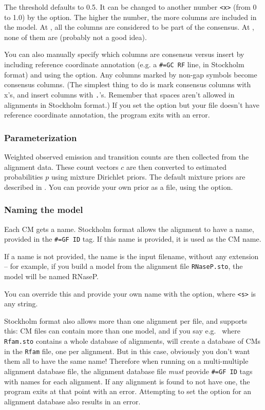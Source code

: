 The threshold defaults to 0.5. It can be changed to another number
\verb+<x>+ (from 0 to 1.0) by the  option.  The
higher the number, the more columns are included in the model.  At
, all the columns are considered to be part of
the consensus. At , none of them are (probably
not a good idea). 

You can also manually specify which columns are consensus versus
insert by including reference coordinate annotation (e.g. a
\verb+#=GC RF+ line, in Stockholm format) and using the 
option. Any columns marked by non-gap symbols become consensus
columns. (The simplest thing to do is mark consensus columns with x's,
and insert columns with \verb+.+'s. Remember that spaces aren't
allowed in alignments in Stockholm format.) If you set the 
option but your file doesn't have reference coordinate annotation, the
program exits with an error.

\subsubsection{Parameterization}

Weighted observed emission and transition counts are then collected
from the alignment data. These count vectors $c$ are then converted to
estimated probabilities $p$ using mixture Dirichlet priors. The
default mixture priors are described in \cite{NawrockiEddy07}. You can
provide your own prior as a file, using the 
option.

\subsubsection{Naming the model}

Each CM gets a name. Stockholm format allows the alignment to have a
name, provided in the \verb+#=GF ID+ tag. If this name is provided,
it is used as the CM name.

If a name is not provided, the name is the input filename, without any
extension -- for example, if you build a model from the alignment file
\verb+RNaseP.sto+, the model will be named RNaseP.

You can override this and provide your own name with the 
option, where \verb+<s>+ is any string.

Stockholm format also allows more than one alignment per file, and
 supports this: CM files can contain more than one
model, and if you say e.g.\  where
\verb+Rfam.sto+ contains a whole database of alignments,
 will create a database of CMs in the \verb+Rfam+ file,
one per alignment. But in this case, obviously you don't want them all
to have the same name! Therefore when running  on a
multi-multiple alignment database file, the alignment database file
\emph{must} provide \verb+#=GF ID+ tags with names for each alignment.
If any alignment is found to not have one, the program exits at that
point with an error. Attempting to set the  option for an
alignment database also results in an error.

